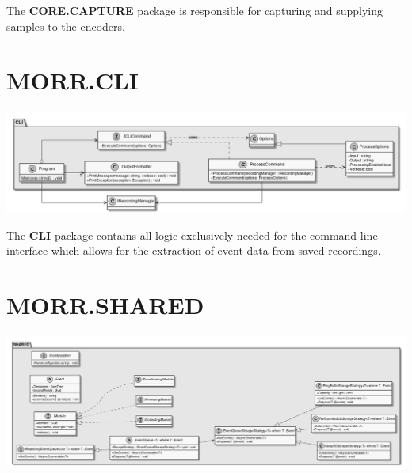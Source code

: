 The \textbf{CORE.CAPTURE} package is responsible for capturing and supplying samples to the encoders.

\begin{packif}
\end{packif}

\begin{packclass}
\end{packclass}

\newpage
\section{MORR.CLI}

\begin{center}
    \includegraphics[width=1.0\textwidth]{resources/Packages/CLI.png}
\end{center}

The \textbf{CLI} package contains all logic exclusively needed for the command line interface which allows for the extraction of event data from saved recordings.

\begin{packif}
\end{packif}

\begin{packclass}
\end{packclass}

\newpage
\section{MORR.SHARED}

\begin{center}
    \includegraphics[width=1.0\textwidth]{resources/Packages/SHARED.png}
\end{center}

